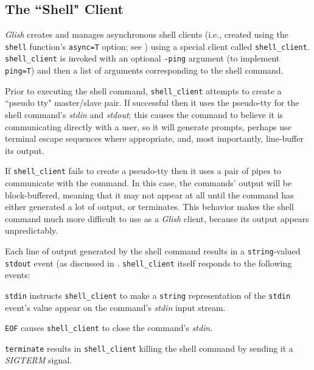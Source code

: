 \begin{sloppy}
\section{The ``Shell" Client}

{\em Glish} creates and manages asynchronous shell clients (i.e., created
using the {\tt shell} function's {\tt async=T} option; see )
using a special client called {\tt shell\_client}.  {\tt shell\_client}
is invoked with an optional {\tt -ping} argument (to implement {\tt ping=T})
and then a list of arguments corresponding to the shell command.

Prior to executing the shell command, {\tt shell\_client} attempts
to create a ``pseudo tty" master/slave pair.  If successful then
it uses the pseudo-tty for the shell command's {\em stdin} and {\em stdout\/};
this causes the command to believe it is communicating directly with
a user, so it will generate prompts, perhaps use terminal escape sequences
where appropriate, and, most importantly, line-buffer its output.

If {\tt shell\_client} fails to create a pseudo-tty then it uses a
pair of pipes to communicate with the command.  In this case, the commands'
output will be block-buffered, meaning that it may not appear at all
until the command has either generated a lot of output, or terminates.
This behavior makes the shell command much more difficult to use as
a {\em Glish} client, because its output appears unpredictably.

Each line of output generated by
the shell command results in a {\tt string}-valued 
{\tt stdout} event
(as discussed in .
{\tt shell\_client} itself responds to the following events:
\begin{list}{}{}

\item[{\tt stdin}] instructs
{\tt shell\_client} to make a {\tt string}
representation of the {\tt stdin} event's value appear on the command's
{\em stdin} input stream.

\item[{\tt EOF}] causes
{\tt shell\_client} to close the command's {\em stdin\/}.

\item[{\tt terminate}] results
in {\tt shell\_client} killing the
shell command by sending it a {\em SIGTERM} signal.


\end{list}
\end{sloppy}
